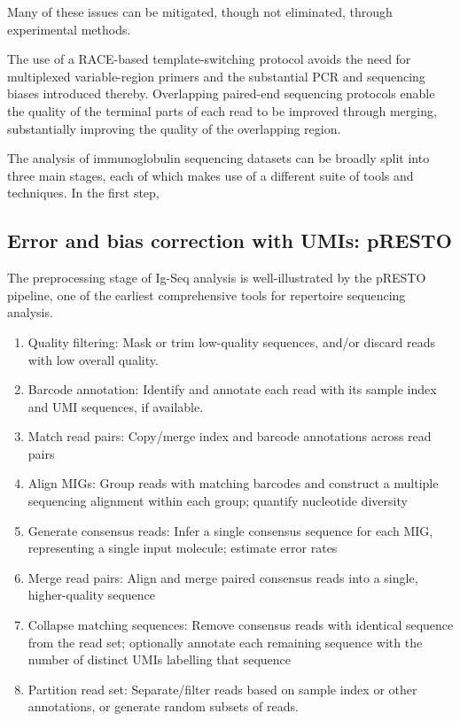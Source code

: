 Many of these issues can be mitigated, though not eliminated, through experimental methods. 

The use of a RACE-based template-switching protocol avoids the need for multiplexed variable-region primers and the substantial PCR and sequencing biases introduced thereby. Overlapping paired-end sequencing protocols enable the quality of the terminal parts of each read to be improved through merging, substantially improving the quality of the overlapping region. 





The analysis of immunoglobulin sequencing datasets can be broadly split into three main stages, each of which makes use of a different suite of tools and techniques. In the first step, 

\subsection{Error and bias correction with UMIs: pRESTO}

The preprocessing stage of Ig-Seq analysis is well-illustrated by the pRESTO pipeline, one of the earliest comprehensive tools for repertoire sequencing analysis.

\begin{enumerate}
\item Quality filtering: Mask or trim low-quality sequences, and/or discard reads with low overall quality.
\item Barcode annotation: Identify and annotate each read with its sample index and UMI sequences, if available. %
\item Match read pairs: Copy/merge index and barcode annotations across read pairs
\item Align MIGs: Group reads with matching barcodes and construct a multiple sequencing alignment within each group; quantify nucleotide diversity
\item Generate consensus reads: Infer a single consensus sequence for each MIG, representing a single input molecule; estimate error rates
\item Merge read pairs: Align and merge paired consensus reads into a single, higher-quality sequence %
\item Collapse matching sequences: Remove consensus reads with identical sequence from the read set; optionally annotate each remaining sequence with the number of distinct UMIs labelling that sequence
\item Partition read set: Separate/filter reads based on sample index or other annotations, or generate random subsets of reads.
\end{enumerate}

